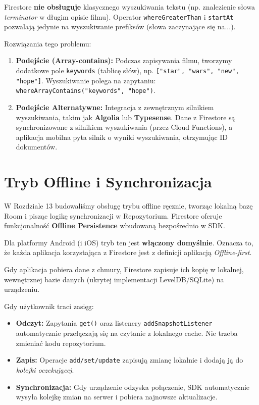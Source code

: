 Firestore \textbf{nie obsługuje} klasycznego wyszukiwania tekstu (np. znalezienie słowa \textit{terminator} w długim opisie filmu).
Operator \texttt{whereGreaterThan} i \texttt{startAt} pozwalają jedynie na wyszukiwanie prefiksów (słowa zaczynające się na...).

Rozwiązania tego problemu:
\begin{enumerate}
    \item \textbf{Podejście (Array-contains):}
    Podczas zapisywania filmu, tworzymy dodatkowe pole \texttt{keywords} (tablicę słów), np. \texttt{["star", "wars", "new", "hope"]}. Wyszukiwanie polega na zapytaniu:
    \texttt{whereArrayContains("keywords", "hope")}.
    
    \item \textbf{Podejście Alternatywne:}
    Integracja z zewnętrznym silnikiem wyszukiwania, takim jak \textbf{Algolia} lub \textbf{Typesense}. Dane z Firestore są synchronizowane z silnikiem wyszukiwania (przez Cloud Functions), a aplikacja mobilna pyta silnik o wyniki wyszukiwania, otrzymując ID dokumentów.
\end{enumerate}

\section{Tryb Offline i Synchronizacja}

W Rozdziale 13 budowaliśmy obsługę trybu offline ręcznie, tworząc lokalną bazę Room i pisząc logikę synchronizacji w Repozytorium. Firestore oferuje funkcjonalność \textbf{Offline Persistence} wbudowaną bezpośrednio w SDK.

Dla platformy Android (i iOS) tryb ten jest \textbf{włączony domyślnie}. Oznacza to, że każda aplikacja korzystająca z Firestore jest z definicji aplikacją \textit{Offline-first}.

Gdy aplikacja pobiera dane z chmury, Firestore zapisuje ich kopię w lokalnej, wewnętrznej bazie danych (ukrytej implementacji LevelDB/SQLite) na urządzeniu.

Gdy użytkownik traci zasięg:
\begin{itemize}
    \item \textbf{Odczyt:} Zapytania \texttt{get()} oraz listenery \texttt{addSnapshotListener} automatycznie przełączają się na czytanie z lokalnego cache. Nie trzeba zmieniać kodu repozytorium.
    \item \textbf{Zapis:} Operacje \texttt{add/set/update} zapisują zmianę lokalnie i dodają ją do \textit{kolejki oczekującej}.
    \item \textbf{Synchronizacja:} Gdy urządzenie odzyska połączenie, SDK automatycznie wysyła kolejkę zmian na serwer i pobiera najnowsze aktualizacje.
\end{itemize}

